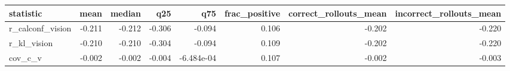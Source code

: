 \begin{tabular}{lrrrrrrr}
\toprule
statistic & mean & median & q25 & q75 & frac\_positive & correct\_rollouts\_mean & incorrect\_rollouts\_mean \\
\midrule
r\_calconf\_vision & -0.211 & -0.212 & -0.306 & -0.094 & 0.106 & -0.202 & -0.220 \\
r\_kl\_vision & -0.210 & -0.210 & -0.304 & -0.094 & 0.109 & -0.202 & -0.220 \\
cov\_c\_v & -0.002 & -0.002 & -0.004 & -6.484e-04 & 0.107 & -0.002 & -0.003 \\
\bottomrule
\end{tabular}
